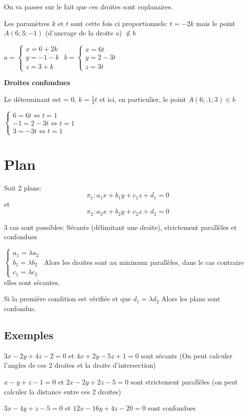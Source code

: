 \documentclass[12pt,a4paper]{report}
\begin{document}
	On va passer sur le fait que ces droites sont coplanaires.
	
	Les paramètres $k$ et $t$ sont cette fois ci proportionnels: $t=-2k$ mais le point $A(6;3;-1)$ (d'ancrage de la droite a) $\notin b$ 
	
		$a=\left\{
	\begin{array}{l}
	x=6+2k \\
	y=-1-k \\
	z=3+k
	\end{array}
	\right.$
		$b=\left\{
	\begin{array}{l}
	x=6t \\
	y=2-3t \\
	z=3t
	\end{array}
	\right.$
	
	\bigskip
	
	\textbf{Droites confondues}
	
	Le déterminant est = 0, $k=\frac{1}{3}t$ et ici, en particulier, le point $A(6;.1;3) \in b$ 
	
	$\left\{
	\begin{array}{l}
	6=6t \Leftrightarrow t=1 \\
	-1=2-3t \Leftrightarrow t=1  \\
	3=-3t \Leftrightarrow t=1
	\end{array}
	\right.$
	
	\pagebreak
	
	\section*{Plan}
	
	\pagebreak
	
	
	Soit 2 plans: \[ \pi_1:a_1x+b_1y+c_1z+d_1=0 \] et \[ \pi_2: a_2x+b_2y+c_2z+d_2=0 \]
	
	3 cas sont possibles: Sécants (délimitant une droite), strictement parallèles et confondues
	
	$\left\{
	\begin{array}{l}
	a_1=\lambda a_2 \\
	b_1=\lambda b_2 \\
	c_1=\lambda c_2
	\end{array}
	\right.$
	Alors les droites sont au minimum parallèles, dans le cas contraire elles sont sécantes.
	
	Si la première condition est vérifiée et que $d_1=\lambda d_2$ Alors les plans sont confondus.
	
	\subsection*{Exemples}
	$3x-2y+4z-2=0$ et $4x+2y-5z+1=0$ sont sécants (On peut calculer l'angles de ces 2 droites et la droite d'intersection)
	
	\smallskip 
	$x-y+z-1=0$ et $2x-2y+2z-5=0$ sont strictement parallèles (on peut calculer la distance entre ces 2 droites)
	
	\smallskip
	$3x-4y+z-5=0$ et $12x-16y+4z-20=0$ sont confondues
	
	
	
\end{document}
